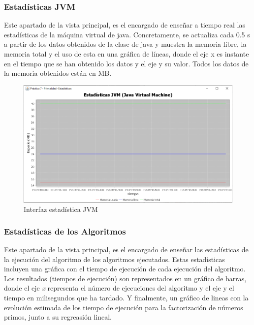 \subsubsection{Estadísticas JVM}\label{Stats JVM}

Este apartado de la vista principal, es el encargado de enseñar a tiempo real las estadísticas de la máquina virtual de java. Concretamente, se actualiza cada 0.5 s a partir de los datos obtenidos de la clase de java  y muestra la memoria libre, la memoria total y el uso de esta en una gráfica de líneas, donde el eje x es instante en el tiempo que se han obtenido los datos y el eje y su valor. Todos los datos de la memoria obtenidos están en MB.

\begin{figure}[!h]
    \centering
    \includegraphics[width=\linewidth]{MVC/View/img/stats-jvm.png}
    \caption{Interfaz estadística JVM}
    \label{fig:Ejemplo stats JVM}
\end{figure}

\subsubsection{Estadísticas de los Algoritmos}\label{Stats Algt}

Este apartado de la vista principal, es el encargado de enseñar las estadísticas de la ejecución del algoritmo de los algoritmos ejecutados. Estas estadísticas incluyen una gráfica con el tiempo de ejecución de cada ejecución del algoritmo. Los resultados (tiempos de ejecución) son representados en un gráfico de barras, donde el eje \textit{x} representa el número de ejecuciones del algoritmo y el eje y el tiempo en milisegundos que ha tardado. Y finalmente, un gráfico de lineas con la evolución estimada de los tiempo de ejecución para la factorización de números primos, junto a su regreasión lineal.

